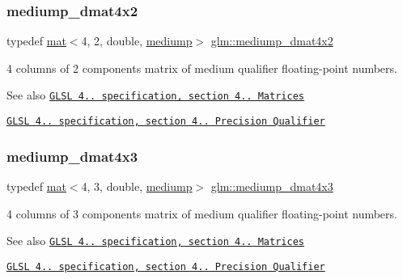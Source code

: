\subsubsection{\texorpdfstring{mediump\+\_\+dmat4x2}{mediump\_dmat4x2}}
{\footnotesize\ttfamily typedef \hyperlink{structglm_1_1mat}{mat}$<$4, 2, double, \hyperlink{namespaceglm_a36ed105b07c7746804d7fdc7cc90ff25a6416f3ea0c9025fb21ed50c4d6620482}{mediump}$>$ \hyperlink{group__core__precision_ga0ef199d025bd14f9fc8f3ebd2b8daaa5}{glm\+::mediump\+\_\+dmat4x2}}

4 columns of 2 components matrix of medium qualifier floating-\/point numbers.

\begin{DoxySeeAlso}{See also}
\href{http://www.opengl.org/registry/doc/GLSLangSpec.4.20.8.pdf}{\tt G\+L\+SL 4.. specification, section 4.. Matrices} 

\href{http://www.opengl.org/registry/doc/GLSLangSpec.4.20.8.pdf}{\tt G\+L\+SL 4.. specification, section 4.. Precision Qualifier} 
\end{DoxySeeAlso}
\mbox{\label{group__core__precision_ga3c31b359e06498f36aae9bfde929a8ce}} 
\subsubsection{\texorpdfstring{mediump\+\_\+dmat4x3}{mediump\_dmat4x3}}
{\footnotesize\ttfamily typedef \hyperlink{structglm_1_1mat}{mat}$<$4, 3, double, \hyperlink{namespaceglm_a36ed105b07c7746804d7fdc7cc90ff25a6416f3ea0c9025fb21ed50c4d6620482}{mediump}$>$ \hyperlink{group__core__precision_ga3c31b359e06498f36aae9bfde929a8ce}{glm\+::mediump\+\_\+dmat4x3}}

4 columns of 3 components matrix of medium qualifier floating-\/point numbers.

\begin{DoxySeeAlso}{See also}
\href{http://www.opengl.org/registry/doc/GLSLangSpec.4.20.8.pdf}{\tt G\+L\+SL 4.. specification, section 4.. Matrices} 

\href{http://www.opengl.org/registry/doc/GLSLangSpec.4.20.8.pdf}{\tt G\+L\+SL 4.. specification, section 4.. Precision Qualifier} 
\end{DoxySeeAlso}
\mbox{\label{group__core__precision_ga53d2b544e1cf6812ed3b2f152d16a770}} 
